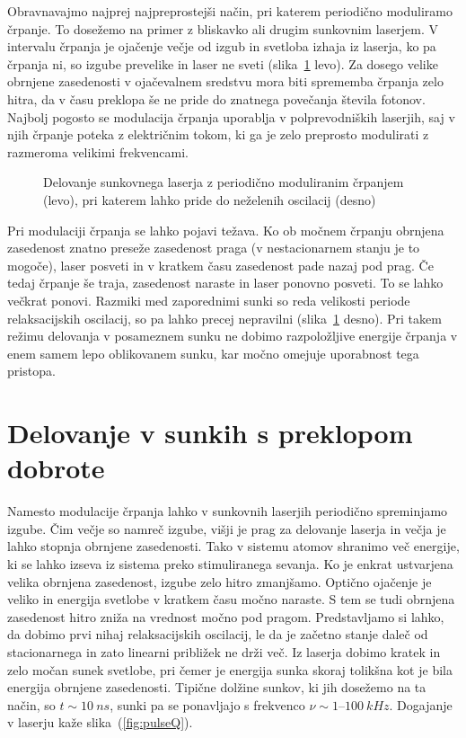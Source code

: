 Obravnavajmo najprej najpreprostejši način, pri katerem periodično moduliramo črpanje.
To dosežemo na primer z bliskavko ali drugim sunkovnim laserjem. V 
intervalu 
črpanja je ojačenje večje od izgub in svetloba izhaja iz laserja, ko pa črpanja 
ni, so izgube prevelike in laser ne sveti (slika~\ref{fig:Gswitch} levo). Za dosego velike
obrnjene zasedenosti v ojačevalnem sredstvu mora biti sprememba črpanja zelo hitra, 
da v času preklopa še ne pride do znatnega povečanja števila fotonov. 
Najbolj pogosto se modulacija črpanja uporablja
v polprevodniških laserjih, saj v njih črpanje poteka z električnim tokom, ki 
ga je zelo preprosto modulirati z razmeroma velikimi frekvencami. 
\begin{figure}[h]
\centering
\def\svgwidth{140truemm} 

\caption{Delovanje sunkovnega laserja z periodično moduliranim črpanjem (levo), 
pri katerem lahko pride do neželenih oscilacij (desno)}
\label{fig:Gswitch}
\end{figure}

Pri modulaciji črpanja se lahko pojavi težava. Ko ob močnem črpanju 
obrnjena zasedenost znatno preseže zasedenost praga (v nestacionarnem stanju 
je to mogoče), laser posveti in v kratkem času zasedenost pade nazaj pod prag. 
Če tedaj črpanje še traja, zasedenost naraste in laser ponovno posveti. 
To se lahko večkrat ponovi. Razmiki med zaporednimi sunki
so reda velikosti periode relaksacijskih oscilacij, so pa lahko precej
nepravilni  (slika~\ref{fig:Gswitch} desno). Pri takem režimu delovanja v posameznem 
sunku ne dobimo razpoložljive energije črpanja v enem samem lepo oblikovanem sunku, 
kar močno omejuje uporabnost tega pristopa.

\section{Delovanje v sunkih s preklopom dobrote}
\label{qswitch}
Namesto modulacije črpanja lahko v sunkovnih laserjih periodično spreminjamo 
izgube. Čim večje so namreč izgube, višji 
je prag za delovanje laserja in 
večja je lahko stopnja obrnjene zasedenosti. Tako v sistemu atomov shranimo več 
energije, ki se lahko izseva iz sistema preko stimuliranega sevanja. 
Ko je enkrat ustvarjena velika obrnjena zasedenost, izgube zelo hitro zmanjšamo. 
Optično ojačenje je veliko in energija svetlobe v kratkem času močno naraste. 
S tem se tudi obrnjena zasedenost hitro zniža na vrednost močno pod pragom.
Predstavljamo si lahko, da dobimo prvi nihaj relaksacijskih oscilacij, le da
je začetno stanje daleč od stacionarnega in zato linearni približek ne drži več.
Iz laserja dobimo kratek in zelo močan sunek svetlobe, pri čemer je energija
sunka skoraj tolikšna kot je bila energija obrnjene zasedenosti. Tipične
dolžine sunkov, ki jih dosežemo na ta način, so $t \sim 10~\si{ns}$, sunki
pa se ponavljajo s frekvenco $\nu \sim 1$--$100~\si{kHz}$.
Dogajanje v laserju kaže slika~(\ref{fig:pulseQ}).

